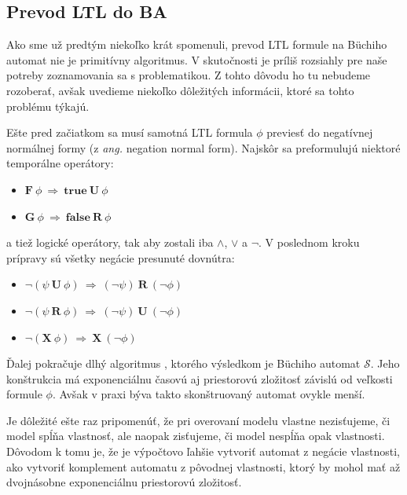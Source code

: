 \documentclass[11pt,final,oneside]{fithesis}
\begin{document}
\subsection{Prevod LTL do BA}
\label{sec:ltltoba}
Ako sme u\v z predt\'ym nieko\v lko kr\'at spomenuli, prevod LTL formule na B\"uchiho automat nie je primit\'ivny algoritmus. V skuto\v cnosti je pr\'ili\v s
rozsiahly pre na\v se potreby zoznamovania sa s problematikou. Z tohto d\^ ovodu ho tu nebudeme rozobera\v t, av\v sak uvedieme nieko\v lko d\^ ole\v zit\'ych 
inform\'acii, ktor\'e sa tohto probl\'emu t\'ykaj\'u.

E\v ste pred za\v ciatkom sa mus\'i samotn\'a LTL formula $\phi$ previes\v t do negat\'ivnej norm\'alnej formy (z \textit{ang.} negation normal form). 
Najsk\^ or sa preformuluj\'u niektor\'e tempor\'alne oper\'atory:
\begin{itemize}
\item $\mathbf{F}\ \phi \ \Rightarrow \ \mathbf{true\ U}\ \phi$
\item $\mathbf{G}\ \phi \ \Rightarrow \ \mathbf{false\ R}\ \phi$
\end{itemize}
a tie\v z logick\'e oper\'atory, tak aby zostali iba $\wedge$, $\vee$ a $\neg$. V poslednom kroku pr\'ipravy s\'u v\v setky neg\'acie presunut\'e dovn\'utra:
\begin{itemize}
\item $\neg(\psi\ \mathbf{U}\ \phi) \ \Rightarrow \ (\neg\psi)\ \mathbf{R}\ (\neg\phi)$
\item $\neg(\psi\ \mathbf{R}\ \phi) \ \Rightarrow \ (\neg\psi)\ \mathbf{U}\ (\neg\phi)$
\item $\neg(\mathbf{X}\ \phi) \ \Rightarrow \ \mathbf{X}\ (\neg\phi)$
\end{itemize}

\v Dalej pokra\v cuje dlh\'y algoritmus \cite{Clarke:MC:LTLtoBA}, ktor\'eho v\'ysledkom je B\"uchiho automat $\mathcal{S}$. Jeho kon\v strukcia m\'a exponenci\'alnu \v casov\'u
aj priestorov\'u zlo\v zitos\v t z\'avisl\'u od ve\v lkosti formule $\phi$. Av\v sak v praxi b\'yva takto skon\v struovan\'y automat ovykle men\v s\'i.

Je d\^ ole\v zit\'e e\v ste raz pripomen\'u\v t, \v ze pri overovan\'i modelu vlastne nezis\v tujeme, \v ci model sp\'l\v na vlastnos\v t, ale naopak 
zis\v tujeme, \v ci model nesp\'l\v na opak vlastnosti. D\^ ovodom k tomu je, \v ze je v\'ypo\v ctovo \v lah\v sie vytvori\v t automat z neg\'acie vlastnosti,
ako vytvori\v t komplement automatu z p\^ ovodnej vlastnosti, ktor\'y by mohol ma\v t a\v z dvojn\'asobne exponenci\'alnu priestorov\'u zlo\v zitos\v t.
\cite{Clarke:MC:LTLtoBA}
\end{document}
